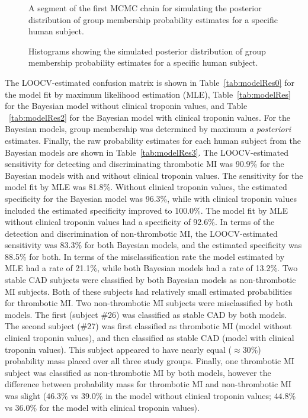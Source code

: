 \begin{DoubleSpace*}
\begin{figure}[H]
	\caption{A segment of the first MCMC chain for simulating the posterior distribution of group membership probability estimates for a specific human subject.  \label{fig:ptid2010MCMC} }
\end{figure}

\begin{figure}[H]
	\caption{Histograms showing the simulated posterior distribution of group membership probability estimates for a specific human subject. \label{fig:ptid2010Hist} }
\end{figure}
 
The LOOCV-estimated confusion matrix is shown in Table~\ref{tab:modelRes0} for the model fit by maximum likelihood estimation (MLE), Table~\ref{tab:modelRes} for the Bayesian model without clinical troponin values, and Table ~\ref{tab:modelRes2} for the Bayesian model with clinical troponin values. For the Bayesian models, group membership was determined by maximum \emph{a posteriori} estimates. Finally, the raw probability estimates for each human subject from the Bayesian models are shown in Table~\ref{tab:modelRes3}. The LOOCV-estimated sensitivity for detecting and discriminating thrombotic MI was 90.9\% for the Bayesian models with and without clinical troponin values. The sensitivity for the model fit by MLE was 81.8\%. Without clinical troponin values, the estimated specificity for the Bayesian model was 96.3\%, while with clinical troponin values included the estimated specificity improved to 100.0\%. The model fit by MLE without clinical troponin values had a specificity of 92.6\%. In terms of the detection and discrimination of non-thrombotic MI, the LOOCV-estimated sensitivity was 83.3\% for both Bayesian models, and the estimated specificity was 88.5\% for both. In terms of the misclassification rate the model estimated by MLE had a rate of 21.1\%, while both Bayesian models had a  rate of 13.2\%. Two stable CAD subjects were classified by both Bayesian models as non-thrombotic MI subjects. Both of these subjects had relatively small estimated probabilities for thrombotic MI. Two non-thrombotic MI subjects were misclassified by both models. The first (subject \#26) was classified as stable CAD by both models. The second subject (\#27) was first classified as thrombotic MI (model without clinical troponin values), and then classified as stable CAD (model with clinical troponin values). This subject appeared to have nearly equal ($\approx 30\%$) probability mass placed over all three study groups. Finally, one thrombotic MI subject was classified as non-thrombotic MI by both models, however the difference between probability mass for thrombotic MI and non-thrombotic MI was slight ($46.3\%$ vs $39.0\%$ in the model without clinical troponin values; $44.8\%$ vs $36.0\%$ for the model with clinical troponin values).


\end{DoubleSpace*}
